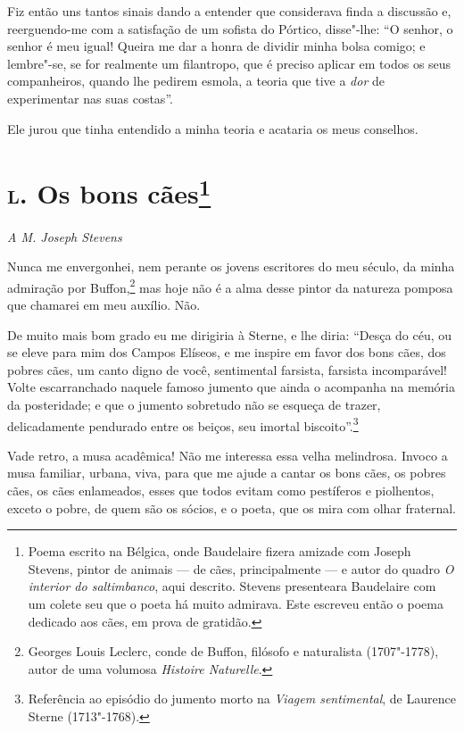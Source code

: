 Fiz então uns tantos sinais dando a entender que considerava
finda a discussão e, reerguendo-me com a satisfação de um sofista do
Pórtico, disse"-lhe: “O senhor, o senhor é meu igual!
Queira me dar a honra de dividir minha bolsa comigo; e lembre"-se, se for
realmente um filantropo, que é preciso aplicar em todos
os seus companheiros, quando lhe pedirem esmola, a teoria que tive a
\textit{dor} de experimentar nas suas costas''.

Ele jurou que tinha entendido a minha teoria e acataria os meus
conselhos.

\chapter{\textsc{l.} Os bons cães\footnote[*]{Poema escrito na Bélgica, 
onde Baudelaire fizera amizade com Joseph
Stevens, pintor de animais --- de cães, principalmente --- e autor do quadro {\itshape O interior do saltimbanco}, aqui descrito. Stevens presenteara Baudelaire com um colete seu que o poeta há muito admirava. Este escreveu então o
poema dedicado aos cães, em prova de gratidão.}}

\begin{flushright}
\textit{A M. Joseph Stevens} 
\end{flushright}

Nunca me envergonhei, nem perante os jovens escritores do meu século,
da minha admiração por Buffon,\footnote{ Georges Louis Leclerc, 
conde de Buffon, filósofo e naturalista
(1707"-1778), autor de uma volumosa \textit{Histoire Naturelle}.}
mas hoje não é a alma
desse pintor da natureza pomposa que chamarei em meu auxílio. Não.

De muito mais bom grado eu me dirigiria à Sterne, e lhe diria:
“Desça do céu, ou se eleve para mim dos Campos Elíseos, e me inspire em favor dos bons cães, dos pobres cães, um
canto digno de você, sentimental farsista, farsista incomparável! Volte
escarranchado naquele famoso jumento que ainda o acompanha na memória
da posteridade; e que o jumento sobretudo não se esqueça de trazer,
delicadamente pendurado entre os beiços, seu imortal
biscoito''.\footnote{ Referência ao episódio do jumento morto na \textit{Viagem sentimental},
de Laurence Sterne (1713"-1768).}

Vade retro, a musa acadêmica! Não me interessa essa velha melindrosa.
Invoco a musa familiar, urbana, viva, para que me ajude a
cantar os bons cães, os pobres cães, os cães enlameados, esses que
todos evitam como pestíferos e piolhentos, exceto o pobre, de quem são
os sócios, e o poeta, que os mira com olhar fraternal.

